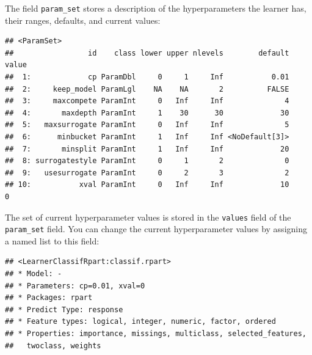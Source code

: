 \documentclass[
]{scrbook}
\newenvironment{Shaded}{\begin{snugshade}}{\end{snugshade}}
\newcommand{\AttributeTok}[1]{\textcolor[rgb]{0.77,0.63,0.00}{#1}}
\newcommand{\DecValTok}[1]{\textcolor[rgb]{0.00,0.00,0.81}{#1}}
\newcommand{\FloatTok}[1]{\textcolor[rgb]{0.00,0.00,0.81}{#1}}
\newcommand{\FunctionTok}[1]{\textcolor[rgb]{0.00,0.00,0.00}{#1}}
\newcommand{\NormalTok}[1]{#1}
\newcommand{\OtherTok}[1]{\textcolor[rgb]{0.56,0.35,0.01}{#1}}
\newcommand{\SpecialCharTok}[1]{\textcolor[rgb]{0.00,0.00,0.00}{#1}}
\renewenvironment{Shaded} {\begin{snugshade}\small} {\end{snugshade}}
\begin{document}
The field \texttt{param\_set} stores a description of the hyperparameters the learner has, their ranges, defaults, and current values:

\begin{Shaded}
\end{Shaded}

\begin{verbatim}
## <ParamSet>
##                 id    class lower upper nlevels        default value
##  1:             cp ParamDbl     0     1     Inf           0.01      
##  2:     keep_model ParamLgl    NA    NA       2          FALSE      
##  3:     maxcompete ParamInt     0   Inf     Inf              4      
##  4:       maxdepth ParamInt     1    30      30             30      
##  5:   maxsurrogate ParamInt     0   Inf     Inf              5      
##  6:      minbucket ParamInt     1   Inf     Inf <NoDefault[3]>      
##  7:       minsplit ParamInt     1   Inf     Inf             20      
##  8: surrogatestyle ParamInt     0     1       2              0      
##  9:   usesurrogate ParamInt     0     2       3              2      
## 10:           xval ParamInt     0   Inf     Inf             10     0
\end{verbatim}

The set of current hyperparameter values is stored in the \texttt{values} field of the \texttt{param\_set} field.
You can change the current hyperparameter values by assigning a named list to this field:

\begin{Shaded}
\end{Shaded}

\begin{verbatim}
## <LearnerClassifRpart:classif.rpart>
## * Model: -
## * Parameters: cp=0.01, xval=0
## * Packages: rpart
## * Predict Type: response
## * Feature types: logical, integer, numeric, factor, ordered
## * Properties: importance, missings, multiclass, selected_features,
##   twoclass, weights
\end{verbatim}
\end{document}

